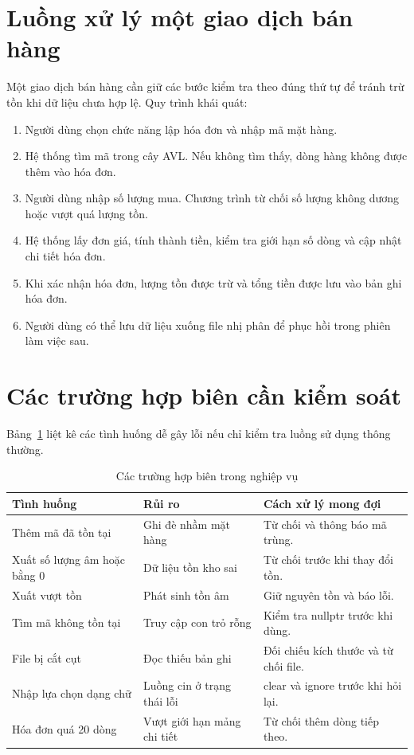 \section{Luồng xử lý một giao dịch bán hàng}
Một giao dịch bán hàng cần giữ các bước kiểm tra theo đúng thứ tự để tránh trừ tồn khi dữ liệu chưa hợp lệ. Quy trình khái quát:
\begin{enumerate}
  \item Người dùng chọn chức năng lập hóa đơn và nhập mã mặt hàng.
  \item Hệ thống tìm mã trong cây AVL. Nếu không tìm thấy, dòng hàng không được thêm vào hóa đơn.
  \item Người dùng nhập số lượng mua. Chương trình từ chối số lượng không dương hoặc vượt quá lượng tồn.
  \item Hệ thống lấy đơn giá, tính thành tiền, kiểm tra giới hạn số dòng và cập nhật chi tiết hóa đơn.
  \item Khi xác nhận hóa đơn, lượng tồn được trừ và tổng tiền được lưu vào bản ghi hóa đơn.
  \item Người dùng có thể lưu dữ liệu xuống file nhị phân để phục hồi trong phiên làm việc sau.
\end{enumerate}

\section{Các trường hợp biên cần kiểm soát}
Bảng~\ref{tab:edge_cases} liệt kê các tình huống dễ gây lỗi nếu chỉ kiểm tra luồng sử dụng thông thường.
\begin{table}[H]
\centering
\caption{Các trường hợp biên trong nghiệp vụ}
\label{tab:edge_cases}
\small
\begin{tabular}{@{}p{3.5cm}p{5.7cm}p{4cm}@{}}
\toprule
\textbf{Tình huống} & \textbf{Rủi ro} & \textbf{Cách xử lý mong đợi} \\
\midrule
Thêm mã đã tồn tại & Ghi đè nhầm mặt hàng & Từ chối và thông báo mã trùng. \\
Xuất số lượng âm hoặc bằng 0 & Dữ liệu tồn kho sai & Từ chối trước khi thay đổi tồn. \\
Xuất vượt tồn & Phát sinh tồn âm & Giữ nguyên tồn và báo lỗi. \\
Tìm mã không tồn tại & Truy cập con trỏ rỗng & Kiểm tra nullptr trước khi dùng. \\
File bị cắt cụt & Đọc thiếu bản ghi & Đối chiếu kích thước và từ chối file. \\
Nhập lựa chọn dạng chữ & Luồng cin ở trạng thái lỗi & clear và ignore trước khi hỏi lại. \\
Hóa đơn quá 20 dòng & Vượt giới hạn mảng chi tiết & Từ chối thêm dòng tiếp theo. \\
\bottomrule
\end{tabular}
\end{table}

